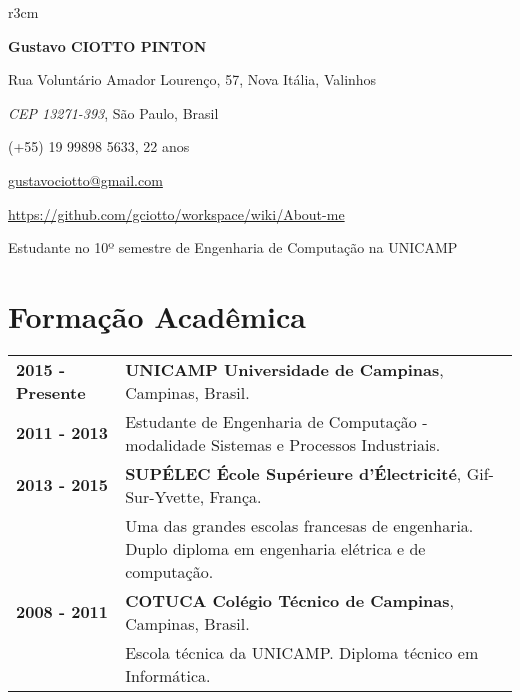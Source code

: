 \documentclass[10pt, a4paper]{article}
\author{Gustavo Ciotto Pinton}
\begin{document}
\pagestyle{empty} 

\begin{wrapfigure}{r}{3cm}
  \vspace{-20pt}
  \begin{center}
  \end{center}
\end{wrapfigure}

\textbf{\LARGE Gustavo CIOTTO PINTON}

Rua Voluntário Amador Lourenço, 57, Nova Itália, Valinhos

\textit{CEP 13271-393}, São Paulo, Brasil

(+55) 19 99898 5633, 22 anos

\url{gustavociotto@gmail.com} 

\url{https://github.com/gciotto/workspace/wiki/About-me}

\vspace{8pt}

{\centerline {\large Estudante no 10º semestre de Engenharia de
Computação na UNICAMP}}



\section{Formação Acadêmica}

\begin{tabular}{p{} p{}}

 \textbf{2015 - Presente} & \textbf{UNICAMP Universidade de Campinas}, Campinas,
 Brasil.
 \\
 \textbf{2011 - 2013} & Estudante de Engenharia de Computação - modalidade
 Sistemas e Processos Industriais. \vspace{8pt}\\

 \textbf{2013 - 2015} & \textbf{SUPÉLEC  École Supérieure d'Électricité},
 Gif-Sur-Yvette, França. \\
 & Uma das grandes escolas francesas de engenharia. Duplo diploma em
 engenharia elétrica e de computação. \vspace{8pt}
 \\
  
 
 \textbf{2008 - 2011} & \textbf{COTUCA Colégio Técnico de Campinas}, Campinas,
 Brasil. \\
 & Escola técnica da UNICAMP. Diploma técnico em Informática. \\
\end{tabular}
\end{document}
